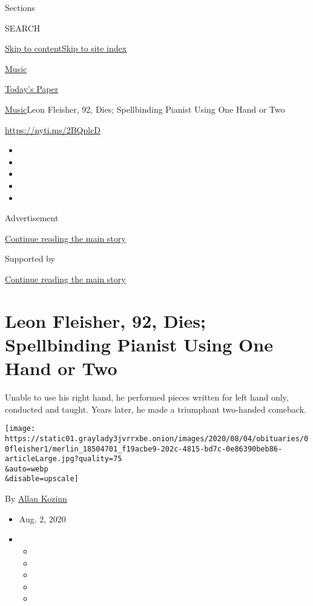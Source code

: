 Sections

SEARCH

\protect\hyperlink{site-content}{Skip to
content}\protect\hyperlink{site-index}{Skip to site index}

\href{https://www.nytimes3xbfgragh.onion/section/arts/music}{Music}

\href{https://myaccount.nytimes3xbfgragh.onion/auth/login?response_type=cookie\&client_id=vi}{}

\href{https://www.nytimes3xbfgragh.onion/section/todayspaper}{Today's
Paper}

\href{/section/arts/music}{Music}\textbar{}Leon Fleisher, 92, Dies;
Spellbinding Pianist Using One Hand or Two

\url{https://nyti.ms/2BQplcD}

\begin{itemize}
\item
\item
\item
\item
\item
\end{itemize}

Advertisement

\protect\hyperlink{after-top}{Continue reading the main story}

Supported by

\protect\hyperlink{after-sponsor}{Continue reading the main story}

\hypertarget{leon-fleisher-92-dies-spellbinding-pianist-using-one-hand-or-two}{%
\section{Leon Fleisher, 92, Dies; Spellbinding Pianist Using One Hand or
Two}\label{leon-fleisher-92-dies-spellbinding-pianist-using-one-hand-or-two}}

Unable to use his right hand, he performed pieces written for left hand
only, conducted and taught. Years later, he made a triumphant two-handed
comeback.

\texttt{[image: https://static01.graylady3jvrrxbe.onion/images/2020/08/04/obituaries/00fleisher1/merlin\_18504701\_f19acbe9-202c-4815-bd7c-0e86390beb86-articleLarge.jpg?quality=75\\\&auto=webp\\\&disable=upscale]}

By \href{https://www.nytimes3xbfgragh.onion/by/allan-kozinn}{Allan
Kozinn}

\begin{itemize}
\item
  Aug. 2, 2020
\item
  \begin{itemize}
  \item
  \item
  \item
  \item
  \item
  \end{itemize}
\end{itemize}

